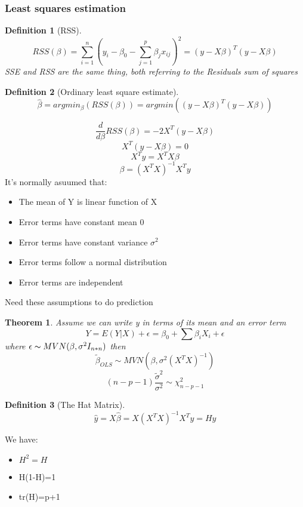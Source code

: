 \documentclass[10pt]{article}
\theoremstyle{break}
\newtheorem{thm}{Theorem}[subsection]
\newtheorem{defn}{Definition}[subsection]
\begin{document}
        \subsubsection{Least squares estimation}
            \begin{defn}[RSS]
                $$RSS(\beta)=\sum_{i=1}^{n}\left(y_i-\beta_0-\sum_{j=1}^{p}\beta_jx_{ij}\right)^2=(y-X\beta)^T(y-X\beta)$$
                SSE and RSS are the same thing, both referring to the Residuals sum of squares\\
            \end{defn}
            \begin{defn}[Ordinary least square estimate]
                $$\hat{\beta}=argmin_\beta (RSS(\beta))=argmin\left((y-X\beta)^T(y-X\beta)\right)$$
            \end{defn}
            $$\frac{d}{d\beta}RSS(\beta)=-2X^T(y-X\beta)$$
            $$X^T(y-X\beta)=0$$
            $$X^Ty=X^TX\beta$$
            $$\beta=(X^TX)^{-1}X^Ty$$
            It's normally asuumed that:\\
            \begin{itemize}
                \item The mean of Y is linear function of X
                \item Error terms have constant mean 0
                \item Error terms have constant variance $\sigma ^2$
                \item Error terms follow a normal distribution
                \item Error terms are independent
            \end{itemize}
            Need these assumptions to do prediction
           \begin{thm}
               Assume we can write y in terms of its mean and an error term
               $$Y=E(Y|X)+\epsilon=\beta_0+\sum\beta_iX_i+\epsilon$$
               where $\epsilon \thicksim MVN(\beta, \sigma^2I_{n*n})$
               then
               $$\tilde{\beta}_{OLS}\sim MVN(\beta, \sigma^2(X^TX)^{-1}) $$
               $$(n-p-1)\frac{\tilde{\sigma}^2}{\sigma^2}\sim \chi^2_{n-p-1}$$
           \end{thm}
            \begin{defn}[The Hat Matrix]
                $$\hat{y}=X\hat{\beta}=X(X^TX)^{-1}X^Ty=Hy$$
            \end{defn}
            We have:
            \begin{itemize}
                \item $H^2=H$
                \item H(1-H)=1
                \item tr(H)=p+1
            \end{itemize}
\end{document}

